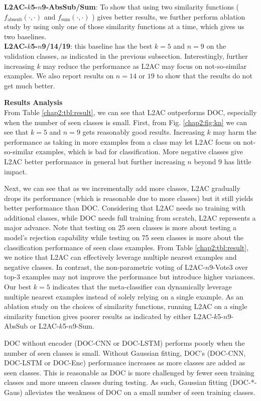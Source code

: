 \textbf{L2AC-$k$5-$n$9-AbsSub/Sum}: To show that using two similarity functions ($f_\text{abssub}(\cdot, \cdot)$ and $f_\text{sum}(\cdot, \cdot)$ ) gives better results, we further perform ablation study by using only one of those similarity functions at a time, which gives us two baselines.\\
\textbf{L2AC-$k$5-$n$9/14/19}: this baseline has the best $k=5$ and $n=9$ on the validation classes, as indicated in the previous subsection. Interestingly, further increasing $k$ may reduce the performance as L2AC may focus on not-so-similar examples. We also report results on $n=14$ or $19$ to show that the results do not get much better. 

\textbf{Results Analysis}\\
From Table \ref{chap2:tbl:result}, we can see that L2AC outperforms DOC, especially when the number of seen classes is small. 
First, from Fig. \ref{chap2:fig:kn} we can see that $k=5$ and $n=9$ gets reasonably good results.
Increasing $k$ may harm the performance as taking in more examples from a class may let L2AC focus on not-so-similar examples, which is bad for classification. More negative classes give L2AC better performance in general but further increasing $n$ beyond 9 has little impact.

Next, we can see that as we incrementally add more classes, L2AC gradually drops its performance (which is reasonable due to more classes) but it still yields better performance than DOC. Considering that L2AC needs no training with additional classes, while DOC needs full training from scratch, L2AC  represents a major advance. Note that testing on 25 seen classes is more about testing a model's rejection capability while testing on 75 seen classes is more about the classification performance of seen class examples.
From Table \ref{chap2:tbl:result}, we notice that L2AC can effectively leverage multiple nearest examples and negative classes.
In contrast, the non-parametric voting of L2AC-$n$9-Vote3 over top-3 examples may not improve the performance but introduce higher variances.
Our best $k=5$ indicates that the meta-classifier can dynamically leverage multiple nearest examples instead of solely relying on a single example.
As an ablation study on the choices of similarity functions, running L2AC on a single similarity function gives poorer results as indicated by either L2AC-$k$5-$n$9-AbsSub or L2AC-$k$5-$n$9-Sum.

DOC without encoder (DOC-CNN or DOC-LSTM) performs poorly when the number of seen classes is small.
Without Gaussian fitting, DOC's (DOC-CNN, DOC-LSTM or DOC-Enc) performance increases as more classes are added as seen classes. This is reasonable as DOC is more challenged by fewer seen training classes and more unseen classes during testing. 
As such, Gaussian fitting (DOC-*-Gaus) alleviates the weakness of DOC on a small number of seen training classes.

